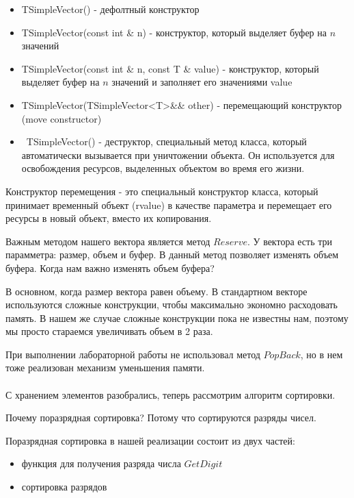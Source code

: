 \begin{itemize}
	\item TSimpleVector() - дефолтный конструктор
	\item TSimpleVector(const int \& n) - конструктор, который выделяет буфер на $n$ значений
	\item TSimpleVector(const int \& n, const T \& value) - конструктор, который выделяет буфер на $n$ значений и заполняет его значениями value
	\item TSimpleVector(TSimpleVector<T>\&\& other) - перемещающий конструктор (move constructor)
	\item ~TSimpleVector() - деструктор, специальный метод класса, который автоматически вызывается при уничтожении объекта. Он используется для освобождения ресурсов, выделенных объектом во время его жизни.
\end{itemize}


Конструктор перемещения - это специальный конструктор класса, который принимает временный объект (rvalue) 
в качестве параметра и перемещает его ресурсы в новый объект, вместо их копирования.

Важным методом нашего вектора является метод $Reserve$. У вектора есть три парамметра: размер, объем и буфер. 
В данный метод позволяет изменять объем буфера. Когда нам важно изменять объем буфера?

В основном, когда размер вектора равен объему. В стандартном векторе используются сложные конструкции, чтобы максимально экономно расходовать память.
В нашем же случае сложные конструкции пока не известны нам, поэтому мы просто стараемся увеличивать объем в 2 раза.

При выполнении лабораторной работы не использовал метод $PopBack$, но в нем тоже реализован механизм уменьшения памяти.\\\\

С хранением элементов разобрались, теперь рассмотрим алгоритм сортировки.

Почему поразрядная сортировка? Потому что сортируются разряды чисел.

Поразрядная сортировка в нашей реализации состоит из двух частей: \\

\begin{itemize}
	\item функция для получения разряда числа $GetDigit$
	\item сортировка разрядов
\end{itemize}

